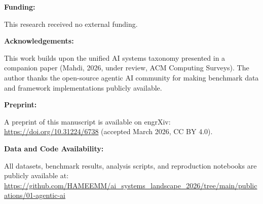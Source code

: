 \documentclass[12pt]{article}
\begin{document}
\bigskip

\noindent\textbf{Funding:}

This research received no external funding.

\bigskip

\noindent\textbf{Acknowledgements:}

This work builds upon the unified AI systems taxonomy presented in a
companion paper (Mahdi, 2026, under review, ACM Computing Surveys).
The author thanks the open-source agentic AI community for making
benchmark data and framework implementations publicly available.

\bigskip

\noindent\textbf{Preprint:}

A preprint of this manuscript is available on engrXiv:
\url{https://doi.org/10.31224/6738} (accepted March 2026, CC BY 4.0).

\bigskip

\noindent\textbf{Data and Code Availability:}

All datasets, benchmark results, analysis scripts, and reproduction
notebooks are publicly available at:
\url{https://github.com/HAMEEMM/ai_systems_landscape_2026/tree/main/publications/01-agentic-ai}
\end{document}
